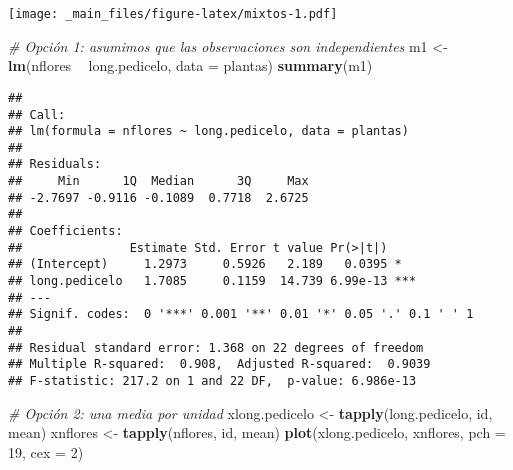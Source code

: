 \documentclass[
]{book}
\newenvironment{Shaded}{\begin{snugshade}}{\end{snugshade}}
\newcommand{\CommentTok}[1]{\textcolor[rgb]{0.56,0.35,0.01}{\textit{#1}}}
\newcommand{\DataTypeTok}[1]{\textcolor[rgb]{0.13,0.29,0.53}{#1}}
\newcommand{\DecValTok}[1]{\textcolor[rgb]{0.00,0.00,0.81}{#1}}
\newcommand{\KeywordTok}[1]{\textcolor[rgb]{0.13,0.29,0.53}{\textbf{#1}}}
\newcommand{\NormalTok}[1]{#1}
\newcommand{\OperatorTok}[1]{\textcolor[rgb]{0.81,0.36,0.00}{\textbf{#1}}}
\newcommand{\StringTok}[1]{\textcolor[rgb]{0.31,0.60,0.02}{#1}}
\begin{document}
\begin{Shaded}
\end{Shaded}

\texttt{[image: \_main\_files/figure-latex/mixtos-1.pdf]}

\begin{Shaded}
\begin{Highlighting}[]
\CommentTok{# Opción 1: asumimos que las observaciones son independientes}
\NormalTok{m1 <-}\StringTok{ }\KeywordTok{lm}\NormalTok{(nflores }\OperatorTok{~}\StringTok{ }\NormalTok{long.pedicelo, }\DataTypeTok{data =}\NormalTok{ plantas)}
\KeywordTok{summary}\NormalTok{(m1)}
\end{Highlighting}
\end{Shaded}

\begin{verbatim}
## 
## Call:
## lm(formula = nflores ~ long.pedicelo, data = plantas)
## 
## Residuals:
##     Min      1Q  Median      3Q     Max 
## -2.7697 -0.9116 -0.1089  0.7718  2.6725 
## 
## Coefficients:
##               Estimate Std. Error t value Pr(>|t|)    
## (Intercept)     1.2973     0.5926   2.189   0.0395 *  
## long.pedicelo   1.7085     0.1159  14.739 6.99e-13 ***
## ---
## Signif. codes:  0 '***' 0.001 '**' 0.01 '*' 0.05 '.' 0.1 ' ' 1
## 
## Residual standard error: 1.368 on 22 degrees of freedom
## Multiple R-squared:  0.908,  Adjusted R-squared:  0.9039 
## F-statistic: 217.2 on 1 and 22 DF,  p-value: 6.986e-13
\end{verbatim}

\begin{Shaded}
\begin{Highlighting}[]
\CommentTok{# Opción 2: una media por unidad}
\NormalTok{xlong.pedicelo <-}\StringTok{ }\KeywordTok{tapply}\NormalTok{(long.pedicelo, id, mean)}
\NormalTok{xnflores <-}\StringTok{ }\KeywordTok{tapply}\NormalTok{(nflores, id, mean)}
\KeywordTok{plot}\NormalTok{(xlong.pedicelo, xnflores, }\DataTypeTok{pch =} \DecValTok{19}\NormalTok{, }\DataTypeTok{cex =} \DecValTok{2}\NormalTok{)}
\end{Highlighting}
\end{Shaded}
\end{document}
